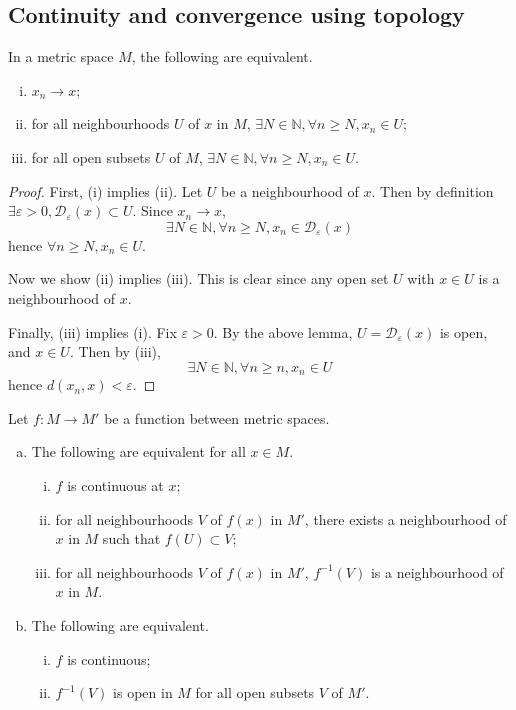\subsection{Continuity and convergence using topology}
\begin{proposition}
	In a metric space \( M \), the following are equivalent.
	\begin{enumerate}[(i)]
		\item \( x_n \to x \);
		\item for all neighbourhoods \( U \) of \( x \) in \( M \), \( \exists N \in \mathbb N, \forall n \geq N, x_n \in U \);
		\item for all open subsets \( U \) of \( M \), \( \exists N \in \mathbb N, \forall n \geq N, x_n \in U \).
	\end{enumerate}
\end{proposition}
\begin{proof}
	First, (i) implies (ii).
	Let \( U \) be a neighbourhood of \( x \).
	Then by definition \( \exists \varepsilon > 0, \mathcal D_\varepsilon(x) \subset U \).
	Since \( x_n \to x \),
	\[
		\exists N \in \mathbb N, \forall n \geq N, x_n \in \mathcal D_\varepsilon(x)
	\]
	hence \( \forall n \geq N, x_n \in U \).

	Now we show (ii) implies (iii).
	This is clear since any open set \( U \) with \( x \in U \) is a neighbourhood of \( x \).

	Finally, (iii) implies (i).
	Fix \( \varepsilon > 0 \).
	By the above lemma, \( U = \mathcal D_\varepsilon(x) \) is open, and \( x \in U \).
	Then by (iii),
	\[
		\exists N \in \mathbb N, \forall n \geq n, x_n \in U
	\]
	hence \( d(x_n, x) < \varepsilon \).
\end{proof}
\begin{proposition}
	Let \( f \colon M \to M' \) be a function between metric spaces.
	\begin{enumerate}[(a)]
		\item The following are equivalent for all \( x \in M \).
		      \begin{enumerate}[(i)]
			      \item \( f \) is continuous at \( x \);
			      \item for all neighbourhoods \( V \) of \( f(x) \) in \( M' \), there exists a neighbourhood of \( x \) in \( M \) such that \( f(U) \subset V \);
			      \item for all neighbourhoods \( V \) of \( f(x) \) in \( M' \), \( f^{-1}(V) \) is a neighbourhood of \( x \) in \( M \).
		      \end{enumerate}
		\item The following are equivalent.
		      \begin{enumerate}[(i)]
			      \item \( f \) is continuous;
			      \item \( f^{-1}(V) \) is open in \( M \) for all open subsets \( V \) of \( M' \).
		      \end{enumerate}
	\end{enumerate}
\end{proposition}
